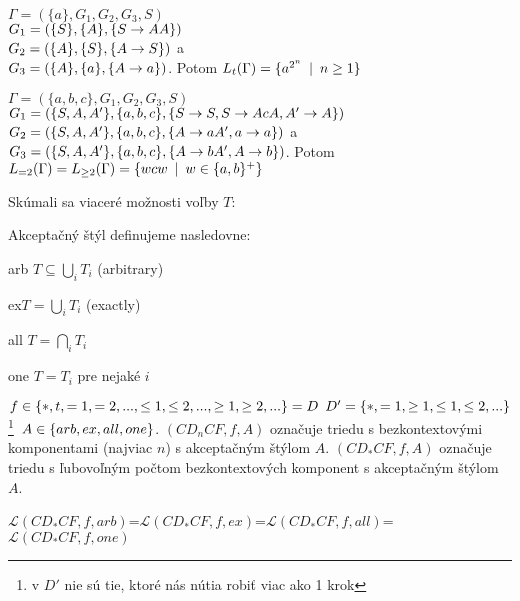 \begin{priklad}
$\Gamma = (\{a\},G_1,G_2,G_3,S)$\\ $G_1 = (\{S\},\{A\},\{S\rightarrow AA\})$\\ $G_2 =
(\{A\},\{S\},\{A\rightarrow S\})$ a\\
$G_3 = (\{A\},\{a\},\{A\rightarrow a\})$. Potom $L_t(\Gamma)
=\{a^{2^n} \enspace |\enspace n\geq 1\}$
\end{priklad}

\begin{priklad}
$\Gamma = (\{a,b,c\},G_1,G_2,G_3,S)$\\ $G_1 = (\{S,A,A'\},\{a,b,c\},\{S\rightarrow S, S\rightarrow AcA,
A'\rightarrow A\})$\\ $G_2 = (\{S,A,A'\},\{a,b,c\},\{A\rightarrow aA',a\rightarrow a\})$ a\\
$G_3 =
(\{S,A,A'\},\{a,b,c\},\{A\rightarrow bA', A\rightarrow b\})$. Potom $ L_{=2}(\Gamma) = L_{\geq 2}(\Gamma)
= \{wcw \enspace |\enspace w \in \{a,b\}^+\}$
\end{priklad}

Skúmali sa viaceré možnosti voľby $T$:

\begin{definicia}
Akceptačný štýl definujeme nasledovne:
\begin{description}
\item{arb} $T\subseteq \underset{i}\bigcup T_i$ (arbitrary)
\item{ex}\med $T = \underset{i}\bigcup T_i$ (exactly)
\item{all} $T = \underset{i}\bigcap T_i$
\item{one} $T = T_i$ pre nejaké $i$
\end{description}
\end{definicia}

\begin{oznacenie}
$f \in \{*,t,=1,=2,...,\leq 1,\leq 2,...,\geq 1,\geq 2,...\}=D \enspace D'=\{*,=1,\geq 1,\leq
1,\leq 2,...\}$\footnote{v $D'$ nie sú tie, ktoré nás nútia robiť viac ako 1 krok}$ \enspace
A \in \{arb,ex,all,one\}$. \med$(CD_nCF,f,A)$ označuje triedu s bezkontextovými
komponentami (najviac $n$) s akceptačným štýlom $A$. \med$(CD_*CF,f,A)$ označuje triedu s
ľubovoľným počtom bezkontextových komponent s akceptačným štýlom $A$.

\end{oznacenie}

\begin{veta}
$\mathcal{L}(CD_*CF,f,arb)$=$\mathcal{L}(CD_*CF,f,ex)$=$\mathcal{L}(CD_*CF,f,all)$=
$\mathcal{L}(CD_*CF,f,one)$
\end{veta}

